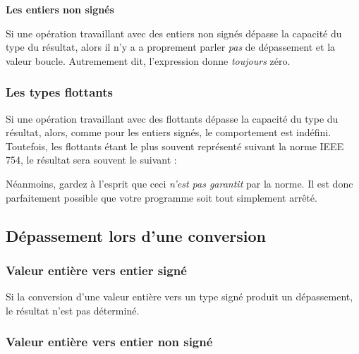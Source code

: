 \textbf{Les entiers non signés}
\label{les-entiers-non-signes-2}

Si une opération travaillant avec des entiers non signés dépasse la
capacité du type du résultat, alors il n'y a a proprement parler
\emph{pas} de dépassement et la valeur boucle. Autremement dit,
l'expression  donne \emph{toujours} zéro.

\subsubsection{Les types flottants}
\label{les-types-flottants}

Si une opération travaillant avec des flottants dépasse la capacité du
type du résultat, alors, comme pour les entiers signés, le comportement
est indéfini. Toutefois, les flottants étant le plus souvent représenté
suivant la norme IEEE 754, le résultat sera souvent le suivant :


Néanmoins, gardez à l'esprit que ceci \emph{n'est pas garantit} par la
norme. Il est donc parfaitement possible que votre programme soit tout
simplement arrêté.

\subsection{Dépassement lors d'une conversion}
\label{depassement-lors-dune-conversion}

\subsubsection{Valeur entière vers entier signé}
\label{valeur-entiere-vers-entier-signe}

Si la conversion d'une valeur entière vers un type signé produit un
dépassement, le résultat n'est pas déterminé.

\subsubsection{Valeur entière vers entier non signé}
\label{valeur-entiere-vers-entier-non-signe}

